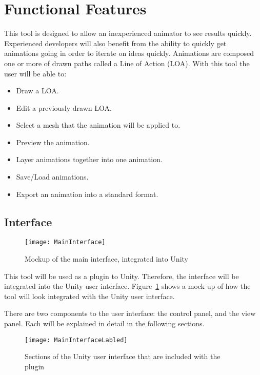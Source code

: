 \section{Functional Features}
	This tool is designed to allow an inexperienced animator to see results quickly.  Experienced developers will also benefit from the ability to quickly get animations going in order to iterate on ideas quickly.  
	Animations are composed one or more of drawn paths called a Line of Action (LOA).  With this tool the user will be able to:
\begin{itemize}
	\item Draw a LOA.
	\item Edit a previously drawn LOA.
	\item Select a mesh that the animation will be applied to.
	\item Preview the animation.
	\item Layer animations together into one animation.
	\item Save/Load animations.
	\item Export an animation into a standard format.
\end{itemize}
\subsection{Interface}
\begin{figure}[H]
\centering
\texttt{[image: MainInterface]}
\caption{Mockup of the main interface, integrated into Unity}
\label{fig:interface}
\end{figure}
This tool will be used as a plugin to Unity.  Therefore, the interface will be integrated into the Unity user interface.  Figure~\ref{fig:interface} shows a mock up of how the tool will look integrated with the Unity user interface.

There are two components to the user interface: the control panel, and the view panel.  Each will be explained in detail in the following sections.
\begin{figure}[H]
\centering
\texttt{[image: MainInterfaceLabled]}
\caption{Sections of the Unity user interface that are included with the plugin}
\label{fig:interfaceLabled}
\end{figure}
